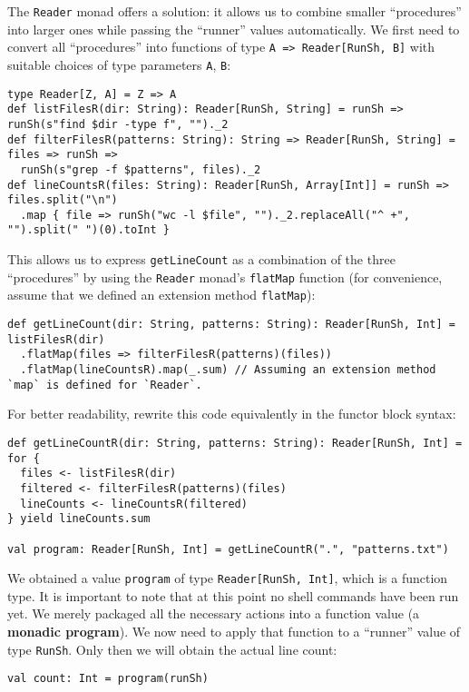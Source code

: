 The \lstinline!Reader! monad offers a solution: it allows us to combine
smaller \textsf{``}procedures\textsf{''} into larger ones while passing the \textsf{``}runner\textsf{''}
values automatically. We first need to convert all \textsf{``}procedures\textsf{''}
into functions of type \lstinline!A => Reader[RunSh, B]! with suitable
choices of type parameters \lstinline!A!, \lstinline!B!:
\begin{lstlisting}
type Reader[Z, A] = Z => A
def listFilesR(dir: String): Reader[RunSh, String] = runSh => runSh(s"find $dir -type f", "")._2
def filterFilesR(patterns: String): String => Reader[RunSh, String] = files => runSh =>
  runSh(s"grep -f $patterns", files)._2
def lineCountsR(files: String): Reader[RunSh, Array[Int]] = runSh => files.split("\n")
  .map { file => runSh("wc -l $file", "")._2.replaceAll("^ +", "").split(" ")(0).toInt }
\end{lstlisting}
 This allows us to express \lstinline!getLineCount! as a combination
of the three \textsf{``}procedures\textsf{''} by using the \lstinline!Reader! monad\textsf{'}s
\lstinline!flatMap! function (for convenience, assume that we defined
an extension method \lstinline!flatMap!):
\begin{lstlisting}
def getLineCount(dir: String, patterns: String): Reader[RunSh, Int] = listFilesR(dir)
  .flatMap(files => filterFilesR(patterns)(files))
  .flatMap(lineCountsR).map(_.sum) // Assuming an extension method `map` is defined for `Reader`.
\end{lstlisting}
For better readability, rewrite this code equivalently in the functor
block syntax:
\begin{lstlisting}
def getLineCountR(dir: String, patterns: String): Reader[RunSh, Int] = for {
  files <- listFilesR(dir)
  filtered <- filterFilesR(patterns)(files)
  lineCounts <- lineCountsR(filtered)
} yield lineCounts.sum

val program: Reader[RunSh, Int] = getLineCountR(".", "patterns.txt") 
\end{lstlisting}
We obtained a value \lstinline!program! of type \lstinline!Reader[RunSh, Int]!,
which is a function type. It is important to note that at this point
no shell commands have been run yet. We merely packaged all the necessary
actions into a function value (a \textbf{monadic program}).
We now need to apply that function to a \textsf{``}runner\textsf{''}
value of type \lstinline!RunSh!. Only then we will obtain the actual
line count:
\begin{lstlisting}
val count: Int = program(runSh)
\end{lstlisting}


